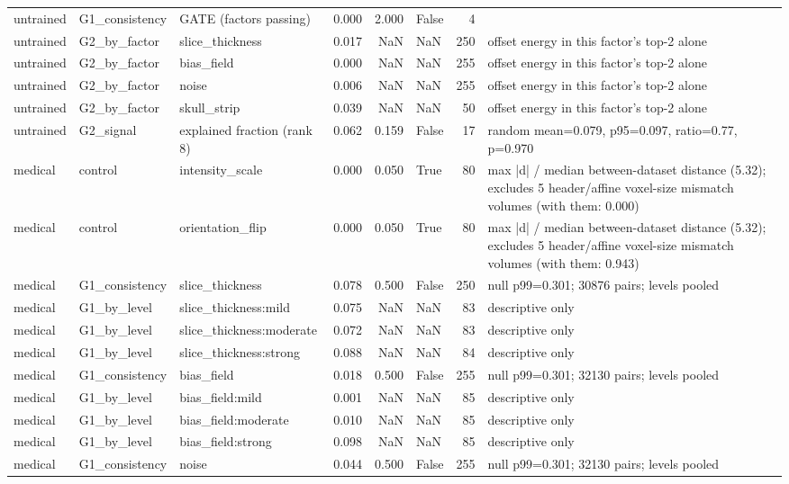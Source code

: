 \begin{tabular}{lllrrlrl}
untrained & G1\_consistency & GATE (factors passing) & 0.000 & 2.000 & False & 4 &  \\
untrained & G2\_by\_factor & slice\_thickness & 0.017 & NaN & NaN & 250 & offset energy in this factor's top-2 alone \\
untrained & G2\_by\_factor & bias\_field & 0.000 & NaN & NaN & 255 & offset energy in this factor's top-2 alone \\
untrained & G2\_by\_factor & noise & 0.006 & NaN & NaN & 255 & offset energy in this factor's top-2 alone \\
untrained & G2\_by\_factor & skull\_strip & 0.039 & NaN & NaN & 50 & offset energy in this factor's top-2 alone \\
untrained & G2\_signal & explained fraction (rank 8) & 0.062 & 0.159 & False & 17 & random mean=0.079, p95=0.097, ratio=0.77, p=0.970 \\
medical & control & intensity\_scale & 0.000 & 0.050 & True & 80 & max |d| / median between-dataset distance (5.32); excludes 5 header/affine voxel-size mismatch volumes (with them: 0.000) \\
medical & control & orientation\_flip & 0.000 & 0.050 & True & 80 & max |d| / median between-dataset distance (5.32); excludes 5 header/affine voxel-size mismatch volumes (with them: 0.943) \\
medical & G1\_consistency & slice\_thickness & 0.078 & 0.500 & False & 250 & null p99=0.301; 30876 pairs; levels pooled \\
medical & G1\_by\_level & slice\_thickness:mild & 0.075 & NaN & NaN & 83 & descriptive only \\
medical & G1\_by\_level & slice\_thickness:moderate & 0.072 & NaN & NaN & 83 & descriptive only \\
medical & G1\_by\_level & slice\_thickness:strong & 0.088 & NaN & NaN & 84 & descriptive only \\
medical & G1\_consistency & bias\_field & 0.018 & 0.500 & False & 255 & null p99=0.301; 32130 pairs; levels pooled \\
medical & G1\_by\_level & bias\_field:mild & 0.001 & NaN & NaN & 85 & descriptive only \\
medical & G1\_by\_level & bias\_field:moderate & 0.010 & NaN & NaN & 85 & descriptive only \\
medical & G1\_by\_level & bias\_field:strong & 0.098 & NaN & NaN & 85 & descriptive only \\
medical & G1\_consistency & noise & 0.044 & 0.500 & False & 255 & null p99=0.301; 32130 pairs; levels pooled \\

\end{tabular}
